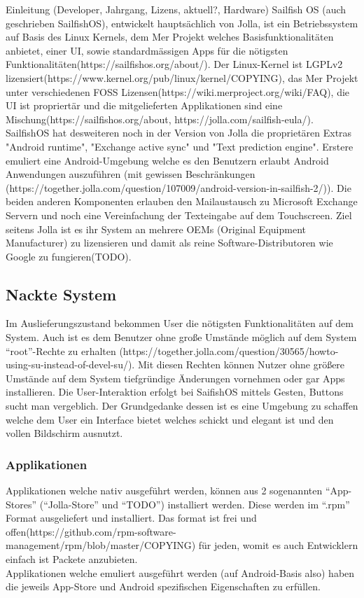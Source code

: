 Einleitung (Developer, Jahrgang, Lizens, aktuell?, Hardware)
Sailfish OS (auch geschrieben SailfishOS), entwickelt hauptsächlich von Jolla, ist ein Betriebssystem auf Basis des Linux Kernels, dem Mer Projekt welches Basisfunktionalitäten anbietet, einer UI, sowie standardmässigen Apps für die nötigsten Funktionalitäten(https://sailfishos.org/about/). Der Linux-Kernel ist LGPLv2 lizensiert(https://www.kernel.org/pub/linux/kernel/COPYING), das Mer Projekt unter verschiedenen FOSS Lizensen(https://wiki.merproject.org/wiki/FAQ), die UI ist propriertär und die mitgelieferten Applikationen sind eine Mischung(https://sailfishos.org/about, https://jolla.com/sailfish-eula/). SailfishOS hat desweiteren noch in der Version von Jolla die proprietären Extras "Android runtime", "Exchange active sync" und "Text prediction engine". Erstere emuliert eine Android-Umgebung welche es den Benutzern erlaubt Android Anwendungen auszuführen (mit gewissen Beschränkungen (https://together.jolla.com/question/107009/android-version-in-sailfish-2/)). Die beiden anderen Komponenten erlauben den Mailaustausch zu Microsoft Exchange Servern und noch eine Vereinfachung der Texteingabe auf dem Touchscreen. Ziel seitens Jolla ist es ihr System an mehrere OEMs (Original Equipment Manufacturer) zu lizensieren und damit als reine Software-Distributoren wie Google zu fungieren(TODO).\\

\subsection{Nackte System}
Im Auslieferungszustand bekommen User die nötigsten Funktionalitäten auf dem System. Auch ist es dem Benutzer ohne große Umstände möglich auf dem System ``root''-Rechte zu erhalten (https://together.jolla.com/question/30565/howto-using-su-instead-of-devel-su/). Mit diesen Rechten können Nutzer ohne größere Umstände auf dem System tiefgründige Änderungen vornehmen oder gar Apps installieren. Die User-Interaktion erfolgt bei SaifishOS mittels Gesten, Buttons sucht man vergeblich. Der Grundgedanke dessen ist es eine Umgebung zu schaffen welche dem User ein Interface bietet welches schickt und elegant ist und den vollen Bildschirm ausnutzt.\\
\subsubsection{Applikationen}
Applikationen welche nativ ausgeführt werden, können aus 2 sogenannten ``App-Stores'' (``Jolla-Store'' und ``TODO'') installiert werden. Diese werden im ``{.}rpm'' Format ausgeliefert und installiert. Das format ist frei und offen(https://github.com/rpm-software-management/rpm/blob/master/COPYING) für jeden, womit es auch Entwicklern einfach ist Packete anzubieten.\\
Applikationen welche emuliert ausgeführt werden (auf Android-Basis also) haben die jeweils App-Store und Android spezifischen Eigenschaften zu erfüllen.\\

